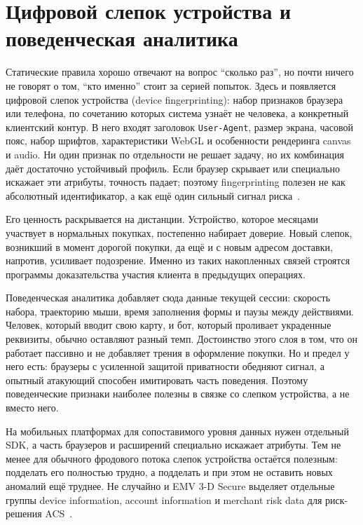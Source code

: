 \section{Цифровой слепок устройства и поведенческая аналитика}
\label{sec:fraud-fingerprint}

Статические правила хорошо отвечают на вопрос \enquote{сколько раз},
но почти ничего не говорят о том, \enquote{кто именно} стоит за
серией попыток. Здесь и появляется цифровой слепок устройства
(device fingerprinting): набор признаков браузера или телефона, по
сочетанию которых система узнаёт не человека, а конкретный
клиентский контур. В него входят заголовок \texttt{User-Agent},
размер экрана, часовой пояс, набор шрифтов, характеристики WebGL и
особенности рендеринга canvas и audio. Ни один признак по отдельности
не решает задачу, но их комбинация даёт достаточно устойчивый
профиль. Если браузер скрывает или специально искажает эти
атрибуты, точность падает; поэтому fingerprinting полезен не как
абсолютный идентификатор, а как ещё один сильный сигнал
риска~\cite{panopticlick-fingerprinting-2025}.

Его ценность раскрывается на дистанции. Устройство, которое месяцами
участвует в нормальных покупках, постепенно набирает доверие. Новый
слепок, возникший в момент дорогой покупки, да ещё и с новым адресом
доставки, напротив, усиливает подозрение. Именно из таких накопленных
связей строятся программы доказательства участия клиента в
предыдущих операциях.

Поведенческая аналитика добавляет сюда данные текущей сессии:
скорость набора, траекторию мыши, время заполнения формы и паузы
между действиями. Человек, который вводит свою карту, и бот, который
проливает украденные реквизиты, обычно оставляют разный темп.
Достоинство этого слоя в том, что он работает пассивно и не добавляет
трения в оформление покупки. Но и предел у него есть: браузеры с
усиленной защитой приватности обедняют сигнал, а опытный атакующий
способен имитировать часть поведения. Поэтому поведенческие признаки
наиболее полезны в связке со слепком устройства, а не вместо него.

На мобильных платформах для сопоставимого уровня данных нужен
отдельный SDK, а часть браузеров и расширений специально искажает
атрибуты. Тем не менее для обычного фродового потока слепок
устройства остаётся полезным: подделать его полностью трудно, а
подделать и при этом не оставить новых аномалий ещё труднее. Не
случайно и EMV 3-D Secure выделяет отдельные группы device
information, account information и merchant risk data для риск-решения
ACS~\cite{emvco-3ds-tech-features}.

